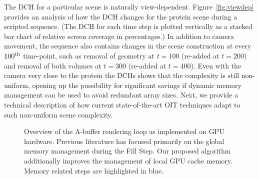 \documentclass{egpubl}
\newcommand{\ab}{\mbox{A-buffer}}
\newcommand{\dch}{DCH}
\begin{document}
The \dch{} for a particular scene is naturally view-dependent. 
Figure~\ref{fig:viewdep} provides an analysis of how the \dch{} changes for the protein scene during a scripted sequence. 
(The \dch{} for each time step is plotted vertically as a stacked bar chart of relative screen coverage in percentages.) 
In addition to camera movement, the sequence also contains changes in the scene construction at every $100\textsuperscript{th}$ time-point, such as removal of geometry at $t=100$ (re-added at $t=200$) and removal of both volumes at $t=300$ (re-added at $t=400$). 
Even with the camera very close to the protein the \dch{}s shows that the complexity is still non-uniform, opening up the possibility for significant savings if dynamic memory management can be used to avoid redundant array sizes. 
Next, we provide a technical description of how current state-of-the-art OIT techniques adapt to such non-uniform scene complexity. 


\newcommand{\bFraglist}{Fragment List}

\newcommand{\bTarget}{Render Target}
\newcommand{\bAnchor}{List Anchor}
\newcommand{\bPool}{Fragment Pool}
\newcommand{\bAtomic}{Atomic}
\newcommand{\bSemaphore}{Semaphore}
\newcommand{\bArray}{Local Array}
\newcommand{\bCounter}{Complexity Counter}

\newcommand{\sClear}{Clear Step}
\newcommand{\sFill}{Fill Step}
\newcommand{\sResolve}{Resolve Step}

\newcommand{\sCount}{Count Step}
\newcommand{\sSegment}{Segmentation Step}
\newcommand{\sTrigger}{Per-Segment Resolve}

\newcommand{\las}{L} %
\newcommand{\abs}{ABuffer\_s}







\begin{figure}[t]
  \centering
    \graphicspath{{figures/}}%
    {\sffamily\footnotesize}
  \caption{\label{fig:abuffer-flowchart} 
	Overview of the \ab{} rendering loop as implemented on GPU hardware. 
	Previous literature has focused primarily on the global memory management during the \sFill. 
	Our proposed algorithm additionally improves the management of local GPU cache memory. 
	Memory related steps are highlighted in blue.
   }
\end{figure}
\end{document}
